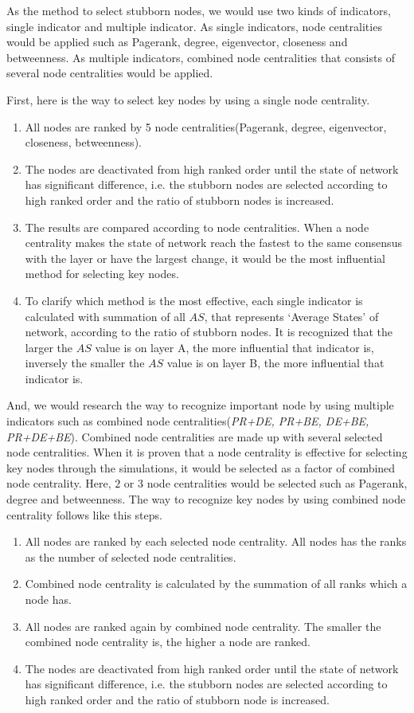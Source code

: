 As the method to select stubborn nodes, we would use two kinds of indicators, single indicator and multiple indicator. As single indicators, node centralities would be applied such as Pagerank, degree, eigenvector, closeness and betweenness. As multiple indicators, combined node centralities that consists of several node centralities would be applied.
  
First, here is the way to select key nodes by using a single node centrality.
\begin{enumerate}
	\item All nodes are ranked by 5 node centralities(Pagerank, degree, eigenvector, closeness, betweenness).
	\item The nodes are deactivated from high ranked order until the state of network has significant difference, i.e. the stubborn nodes are selected according to high ranked order and the ratio of stubborn nodes is increased. 
	\item The results are compared according to node centralities. When a node centrality makes the state of network reach the fastest to the same consensus with the layer or have the largest change, it would be the most influential method for selecting key nodes.
	\item To clarify which method is the most effective, each single indicator is calculated with summation of all $AS$, that represents `Average States' of network, according to the ratio of stubborn nodes. It is recognized that the larger the $AS$ value is on layer A, the more influential that indicator is, inversely the smaller the $AS$ value is on layer B, the more influential that indicator is.
\end{enumerate}

And, we would research the way to recognize important node by using multiple indicators such as combined node centralities(\textit{PR+DE, PR+BE, DE+BE, PR+DE+BE}). Combined node centralities are made up with several selected node centralities. When it is proven that a node centrality is effective for selecting key nodes through the simulations, it would be selected as a factor of combined node centrality. Here, $2$ or $3$ node centralities would be selected such as Pagerank, degree and betweenness. 
The way to recognize key nodes by using combined node centrality follows like this steps. 
\begin{enumerate}
	\item All nodes are ranked by each selected node centrality. All nodes has the ranks as the number of selected node centralities.  
	\item Combined node centrality is calculated by the summation of all ranks which a node has. 
	\item All nodes are ranked again by combined node centrality. The smaller the combined node centrality is, the higher a node are ranked.        
	\item The nodes are deactivated from high ranked order until the state of network has significant difference, i.e. the stubborn nodes are selected according to high ranked order and the ratio of stubborn node is increased. 
\end{enumerate}

